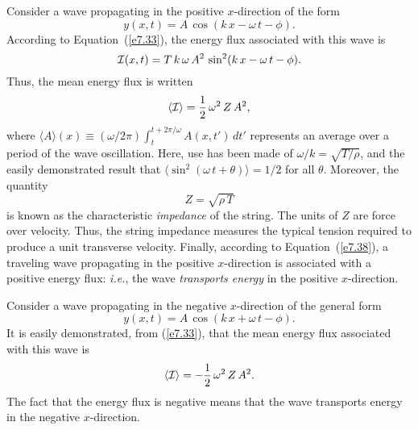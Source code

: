 Consider a  wave propagating in the positive $x$-direction of the form
\begin{equation}
y(x,t) = A\,\cos(k\,x-\omega\,t-\phi).
\end{equation}
According to Equation~(\ref{e7.33}), the energy flux associated with this
wave is
\begin{equation}
{\cal I}(x,t) = T\,k\,\omega\,A^2\,\sin^2(k\,x-\omega\,t-\phi).
\end{equation}
Thus, the mean energy flux is written
\begin{equation}\label{e7.38}
\langle {\cal I}\rangle = \frac{1}{2}\,\omega^2\,Z\,A^2,
\end{equation}
where $\langle A \rangle(x) \equiv (\omega/2\pi)\int_t^{t+2\pi/\omega}A(x,t')\, dt'$ represents an average over a period of the wave oscillation. Here,  use
has been made of $\omega/k=\sqrt{T/\rho}$, and the
easily demonstrated result that $\langle \sin^2(\omega\,t+\theta)\rangle=1/2$ for all $\theta$.  Moreover, the quantity
\begin{equation}
Z = \sqrt{\rho\,T}
\end{equation}
is known as the characteristic {\em impedance}\/ of the string. The units of $Z$
are force over velocity. Thus, the string impedance measures the
typical tension required to produce a unit transverse velocity.
Finally, according to Equation~(\ref{e7.38}), a traveling wave propagating in the positive $x$-direction
is associated with a positive energy flux: {\em i.e.}, the wave {\em transports energy}\/
in the positive $x$-direction. 

Consider a wave propagating in the negative $x$-direction of the general form
\begin{equation}
y(x,t) = A\,\cos(k\,x+\omega\,t-\phi).
\end{equation}
It is easily demonstrated, from (\ref{e7.33}), that the mean energy flux
associated with this wave is
\begin{equation}
\langle {\cal I}\rangle =- \frac{1}{2}\,\omega^2\,Z\,A^2.
\end{equation}
The fact that the energy flux is negative means that the wave transports energy in
the negative $x$-direction. 

